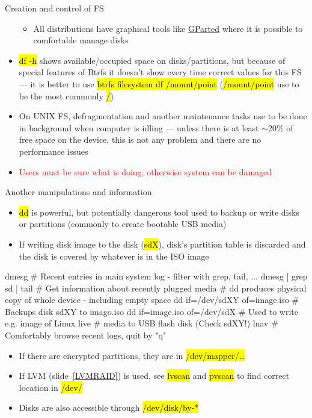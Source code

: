 \documentclass[compress, ucs, xelatex, 11pt, xcolor=svgnames,
  hyperref={
    bookmarks=true,
    unicode=true,
    colorlinks=true,
    pdftitle={Linux, command line and MetaCentrum},
    plainpages=false,
    pdfauthor={Vojtech Zeisek},
    pdfsubject={Course about use of Linux command line, writing shell scripts and using MetaCentrum of CESNET},
    pdfcreator={XeLaTeX},
    pdfkeywords={Linux, GNU, BASH, shell, command line, MetaCentrum},
    linkcolor=DarkRed,
    anchorcolor=DarkBlue,
    citecolor=Indigo,
    filecolor=NavyBlue,
    menucolor=DarkMagenta,
    urlcolor=DarkBlue,
    pdftex},
  url={hyphens, lowtilde} %
  ]{beamer}
\renewcommand{\texttt}[1]{\hl{\ttfamily #1}}
\renewcommand{\alert}[1]{\textcolor{red}{#1}}
\begin{document}
\begin{frame}[allowframebreaks]{Creation and control of FS}
\begin{itemize}
\begin{itemize}
      \item All distributions have graphical tools like \href{https://gparted.org/}{GParted} where it is possible to comfortable manage disks
    \end{itemize}
    \item \texttt{df -h} shows available/occupied space on disks/partitions, but because of special features of Btrfs it doesn't show every time correct values for this FS --- it is better to use \texttt{btrfs filesystem df /mount/point} (\texttt{/mount/point} use to be the most commonly \texttt{/})
    \item On UNIX FS, defragmentation and another maintenance tasks use to be done in background when computer is idling --- unless there is at least $\sim$20\% of free space on the device, this is not any problem and there are no performance issues
    \item \alert{Users must be sure what is doing, otherwise system can be damaged}
  \end{itemize}
\end{frame}

\begin{frame}[fragile]{Another manipulations and information}
  \begin{itemize}
    \item \texttt{dd} is powerful, but potentially dangerous tool used to backup or write disks or partitions (commonly to create bootable USB media)
    \item If writing disk image to the disk (\texttt{sdX}), disk's partition table is discarded and the disk is covered by whatever is in the ISO image
  \end{itemize}
  \begin{bashcode}
    dmesg # Recent entries in main system log - filter with grep, tail, ...
    dmesg | grep sd | tail # Get information about recently plugged media
    # dd produces physical copy of whole device - including empty space
    dd if=/dev/sdXY of=image.iso # Backups disk sdXY to imago.iso
    dd if=image.iso of=/dev/sdX # Used to write e.g. image of Linux live
                                # media to USB flash disk (Check sdXY!)
    lnav # Comfortably browse recent logs, quit by "q"
  \end{bashcode}
  \begin{itemize}
    \item If there are encrypted partitions, they are in \texttt{/dev/mapper/\ldots}
    \item If LVM (slide~\ref{LVMRAID}) is used, see \texttt{lvscan} and \texttt{pvscan} to find correct location in \texttt{/dev/}
    \item Disks are also accessible through \texttt{/dev/disk/by-*}
  \end{itemize}
\end{frame}
\end{document}
